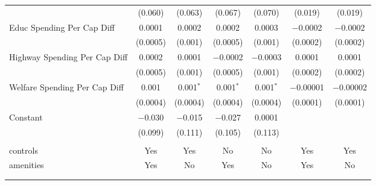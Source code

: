 \begin{table}[!htbp]
\begin{tabular}{@{\extracolsep{5pt}}lcccccc}
  & (0.060) & (0.063) & (0.067) & (0.070) & (0.019) & (0.019) \\ 
  Educ Spending Per Cap Diff & 0.0001 & 0.0002 & 0.0002 & 0.0003 & $-$0.0002 & $-$0.0002 \\ 
  & (0.0005) & (0.001) & (0.0005) & (0.001) & (0.0002) & (0.0002) \\ 
  Highway Spending Per Cap Diff & 0.0002 & 0.0001 & $-$0.0002 & $-$0.0003 & 0.0001 & 0.0001 \\ 
  & (0.0005) & (0.001) & (0.0005) & (0.001) & (0.0002) & (0.0002) \\ 
  Welfare Spending Per Cap Diff & 0.001 & 0.001$^{*}$ & 0.001$^{*}$ & 0.001$^{*}$ & $-$0.00001 & $-$0.00002 \\ 
  & (0.0004) & (0.0004) & (0.0004) & (0.0004) & (0.0001) & (0.0001) \\ 
  Constant & $-$0.030 & $-$0.015 & $-$0.027 & 0.0001 &  &  \\ 
  & (0.099) & (0.111) & (0.105) & (0.113) &  &  \\ 
 \hline \\[-1.8ex] 
controls & Yes & Yes & No & No & Yes & Yes \\ 
amenities & Yes & No & Yes & No & Yes & No \\ 
\hline \\[-1.8ex] 
\hline 
\hline \\[-1.8ex] 
\end{tabular} 
\end{table} 
